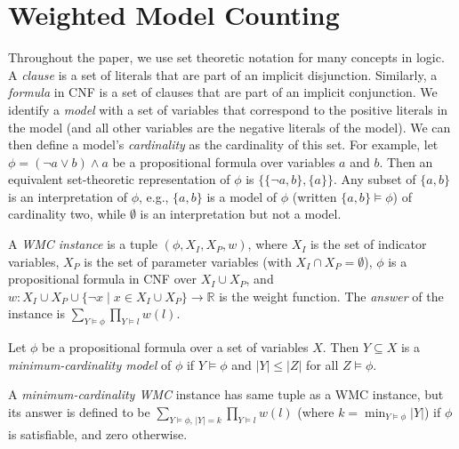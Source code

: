 \documentclass[runningheads]{llncs}
\begin{document}
\section{Weighted Model Counting}


Throughout the paper, we use set theoretic notation for many concepts in logic.
A \emph{clause} is a set of literals that are part of an implicit disjunction.
Similarly, a \emph{formula} in CNF is a set of clauses that are part of an
implicit conjunction. We identify a \emph{model} with a set of variables that
correspond to the positive literals in the model (and all other variables are
the negative literals of the model). We can then define a model's
\emph{cardinality} as the cardinality of this set. For example, let $\phi =
(\neg a \lor b) \land a$ be a propositional formula over variables $a$ and $b$.
Then an equivalent set-theoretic representation of $\phi$ is $\{ \{ \neg a, b
\}, \{ a \} \}$. Any subset of $\{ a, b \}$ is an interpretation of $\phi$,
e.g., $\{ a, b \}$ is a model of $\phi$ (written $\{ a, b \} \models \phi$) of
cardinality two, while $\emptyset$ is an interpretation but not a model.

\begin{definition}[WMC]
  A \emph{WMC instance} is a tuple $(\phi, X_I, X_P, w)$, where $X_I$ is
  the set of indicator variables, $X_P$ is the set of parameter variables (with
  $X_I \cap X_P = \emptyset$), $\phi$ is a propositional formula in CNF over
  $X_I \cup X_P$, and $w\colon X_I \cup X_P \cup \{\neg x \mid x \in X_I \cup
  X_P\} \to \mathbb{R}$ is the weight function. The \emph{answer} of the
  instance is $\sum_{Y \models \phi} \prod_{Y \models l} w(l)$.
\end{definition}

\begin{definition}
  Let $\phi$ be a propositional formula over a set of variables $X$. Then $Y
  \subseteq X$ is a \emph{minimum-cardinality model} of $\phi$ if $Y \models
  \phi$ and $|Y| \le |Z|$ for all $Z \models \phi$.
\end{definition}

\begin{definition}
  A \emph{minimum-cardinality WMC} instance has same tuple as a WMC instance,
  but its answer is defined to be $\sum_{Y \models \phi\text{, }|Y| = k}
  \prod_{Y \models l} w(l)$ (where $k = \min_{Y \models \phi} |Y|$) if $\phi$ is
  satisfiable, and zero otherwise.
\end{definition}
\end{document}
